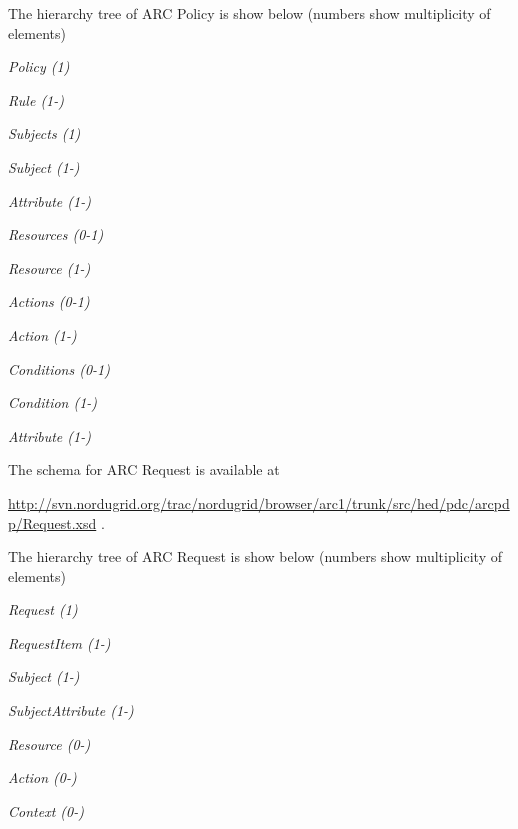 \documentclass{article}
\begin{document}
{\color{black}
The hierarchy tree of ARC Policy is show below (numbers show
multiplicity of elements)}

{\itshape\color{black}
Policy (1)}

{\itshape\color{black}
 Rule (1-)}

{\itshape\color{black}
  Subjects (1)}

{\itshape\color{black}
   Subject (1-)}

{\itshape\color{black}
    Attribute (1-)}

{\itshape\color{black}
   Resources (0-1)}

{\itshape\color{black}
   Resource (1-)}

{\itshape\color{black}
  Actions (0-1)}

{\itshape\color{black}
   Action (1-)}

{\itshape\color{black}
  Conditions (0-1)}

{\itshape\color{black}
   Condition (1-)}

{\itshape\color{black}
    Attribute (1-)}

{\upshape\color{black}
The schema for ARC Request is available at \ }

{\upshape\color{black}
\url{http://svn.nordugrid.org/trac/nordugrid/browser/arc1/trunk/src/hed/pdc/arcpdp/Request.xsd}
.}

{\upshape\color{black}
The hierarchy tree of ARC Request is show below (numbers show
multiplicity of elements)}

{\itshape\color{black}
Request (1)}

{\itshape\color{black}
 RequestItem (1-)}

{\itshape\color{black}
  Subject (1-)}

{\itshape\color{black}
   SubjectAttribute (1-)}

{\itshape\color{black}
  Resource (0-)}

{\itshape\color{black}
  Action (0-)}

{\itshape\color{black}
  Context (0-)}
\end{document}
